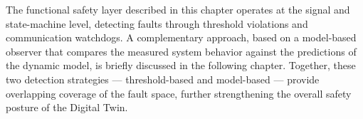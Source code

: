 The functional safety layer described in this chapter operates at the signal and state-machine level, detecting faults through threshold violations and communication watchdogs. A complementary approach, based on a model-based observer that compares the measured system behavior against the predictions of the dynamic model, is briefly discussed in the following chapter. Together, these two detection strategies — threshold-based and model-based — provide overlapping coverage of the fault space, further strengthening the overall safety posture of the Digital Twin.